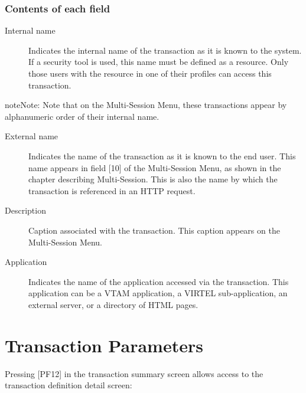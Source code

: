 \documentclass[letterpaper,10pt,english]{sphinxmanual}
\begin{document}
\subsubsection{Contents of each field}
\label{\detokenize{connectivity_guide:id16}}\begin{description}
\item[{Internal name}] \leavevmode
Indicates the internal name of the transaction as it is known to the system. If a security tool is used, this name must be defined as a resource. Only those users with the resource in one of their profiles can access this transaction.

\end{description}

\begin{sphinxadmonition}{note}{Note:}
Note that on the Multi-Session Menu, these transactions appear by alphanumeric order of their internal name.
\end{sphinxadmonition}
\begin{description}
\item[{External name}] \leavevmode
Indicates the name of the transaction as it is known to the end user. This name appears in field {[}10{]} of the Multi-Session Menu, as shown in the chapter describing Multi-Session. This is also the name by which the transaction is referenced in an HTTP request.

\item[{Description}] \leavevmode
Caption associated with the transaction. This caption appears on the Multi-Session Menu.

\item[{Application}] \leavevmode
Indicates the name of the application accessed via the transaction. This application can be a VTAM application, a VIRTEL sub-application, an external server, or a directory of HTML pages.

\end{description}


\section{Transaction Parameters}
\label{\detokenize{connectivity_guide:transaction-parameters}}
Pressing {[}PF12{]} in the transaction summary screen allows access to the transaction definition detail screen:


\end{document}
